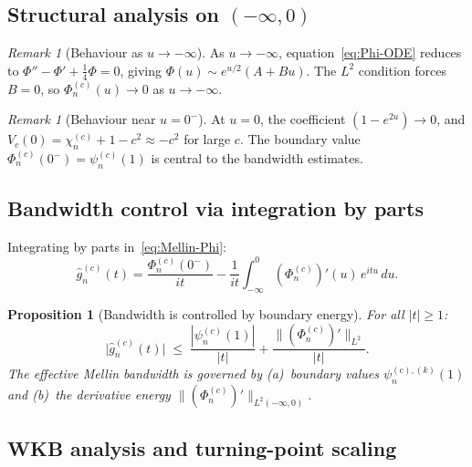 \documentclass[12pt,a4paper]{amsart}
\newtheorem{proposition}[theorem]{Proposition}
\theoremstyle{remark}
\newtheorem{remark}[theorem]{Remark}
\begin{document}
\subsection{Structural analysis on $(-\infty, 0)$}
\label{ssec:ode-analysis}

\begin{remark}[Behaviour as $u \to -\infty$]
\label{rem:u-neg-infty}
As $u \to -\infty$, equation~\eqref{eq:Phi-ODE} reduces to
$\Phi'' - \Phi' + \tfrac{1}{4}\Phi = 0$,
giving $\Phi(u) \sim e^{u/2}(A + Bu)$.
The $L^2$ condition forces $B = 0$, so $\Phi_n^{(c)}(u) \to 0$ as $u \to -\infty$.
\end{remark}

\begin{remark}[Behaviour near $u = 0^-$]
\label{rem:u-near-zero}
At $u = 0$, the coefficient $(1-e^{2u}) \to 0$, and
$V_c(0) = \chi_n^{(c)} + 1 - c^2 \approx -c^2$ for large $c$.
The boundary value $\Phi_n^{(c)}(0^-) = \psi_n^{(c)}(1)$ is central
to the bandwidth estimates.
\end{remark}

\subsection{Bandwidth control via integration by parts}
\label{ssec:bandwidth-ibp}

Integrating by parts in~\eqref{eq:Mellin-Phi}:
\begin{equation}
\label{eq:IBP1}
\widehat{g}_n^{(c)}(t)
= \frac{\Phi_n^{(c)}(0^-)}{it}
- \frac{1}{it}\int_{-\infty}^{0} (\Phi_n^{(c)})'(u)\,e^{itu}\,du.
\end{equation}

\begin{proposition}[Bandwidth is controlled by boundary energy]
\label{prop:ibp-bandwidth}
For all $|t| \ge 1$:
\begin{equation}
\label{eq:bandwidth-IBP}
\bigl|\widehat{g}_n^{(c)}(t)\bigr|
\;\le\;
\frac{|\psi_n^{(c)}(1)|}{|t|}
+ \frac{\|(\Phi_n^{(c)})'\|_{L^2}}{|t|}.
\end{equation}
The effective Mellin bandwidth is governed by (a)~boundary values $\psi_n^{(c),(k)}(1)$
and (b)~the derivative energy $\|(\Phi_n^{(c)})'\|_{L^2(-\infty,0)}$.
\end{proposition}

\subsection{WKB analysis and turning-point scaling}
\label{ssec:wkb}
\end{document}
